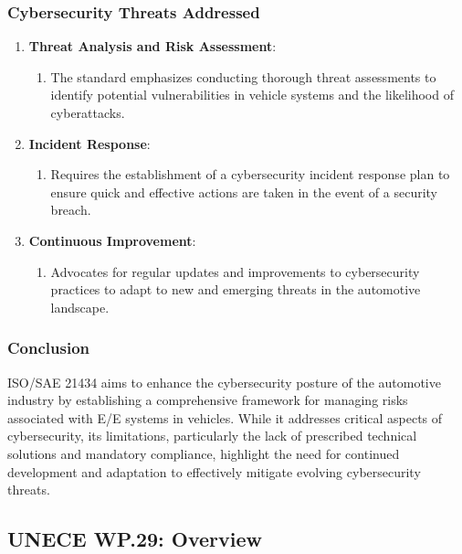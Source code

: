 \subsubsection{Cybersecurity Threats Addressed}\label{subsubsec:cybersecurity-threats-addressed}

\begin{enumerate}
    \item \textbf{Threat Analysis and Risk Assessment}:
    \begin{enumerate}
        \item The standard emphasizes conducting thorough threat assessments to identify potential vulnerabilities in vehicle systems and the likelihood of cyberattacks.
    \end{enumerate}

    \item \textbf{Incident Response}:
    \begin{enumerate}
        \item Requires the establishment of a cybersecurity incident response plan to ensure quick and effective actions are taken in the event of a security breach.
    \end{enumerate}

    \item \textbf{Continuous Improvement}:
    \begin{enumerate}
        \item Advocates for regular updates and improvements to cybersecurity practices to adapt to new and emerging threats in the automotive landscape.
    \end{enumerate}
\end{enumerate}

\subsubsection{Conclusion}\label{subsubsec:conclusion}

ISO/SAE 21434 aims to enhance the cybersecurity posture of the automotive industry by establishing a comprehensive framework for managing risks associated with E/E systems in vehicles.
While it addresses critical aspects of cybersecurity, its limitations, particularly the lack of prescribed technical solutions and mandatory compliance, highlight the need for continued development and adaptation to effectively mitigate evolving cybersecurity threats.

\subsection{UNECE WP.29: Overview}\label{subsec:unece-wp-29}

